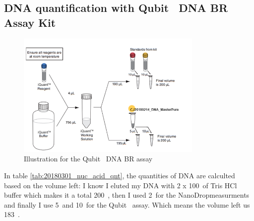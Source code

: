 \subsection{DNA quantification with Qubit\texttrademark~ DNA BR Assay Kit}
\label{task:20180301_cj2}


\begin{figure}[H] %
    \centering
    \caption{Illustration for the Qubit\texttrademark~ DNA BR assay}
    \label{fig:20180301_Qubit_dsDNA_BR}
    \includegraphics[width=0.8\textwidth]{graphics/schemas/20180215_Qubit_dsDNA_BR.png}
\end{figure}


In table \ref{tab:20180301_nuc_acid_qnt}, the quantities of DNA are calculted based on the volume left: I know I eluted my DNA with 2 x 100~\uL of Tris HCl buffer which makes it a total 200~\uL, then I used 2~\uL for the NanoDrop\cR measurments and finally I use 5~\uL and 10~\uL for the Qubit\texttrademark~ assay. Which means the volume left us 183~\uL.

